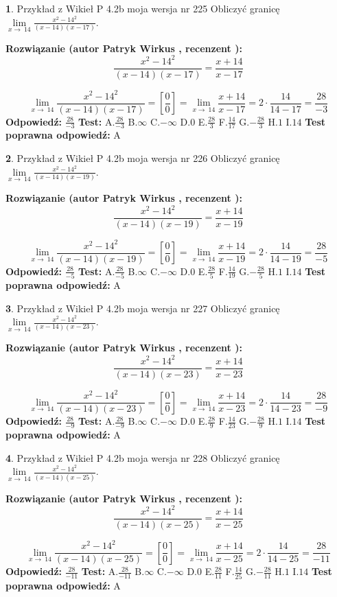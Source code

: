 \documentclass[12pt, a4paper]{article}
\theoremstyle{definition} %
\newtheorem{zad}{}
\newcommand{\zadStart}[1]{\begin{zad}#1\newline}
\newcommand{\zadStop}{\end{zad}}
\newcommand{\rozwStart}[2]{\noindent \textbf{Rozwiązanie (autor #1 , recenzent #2): }\newline}
\newcommand{\rozwStop}{\newline}
\newcommand{\odpStart}{\noindent \textbf{Odpowiedź:}\newline}
\newcommand{\odpStop}{\newline}
\newcommand{\testStart}{\noindent \textbf{Test:}\newline}
\newcommand{\testStop}{\newline}
\newcommand{\kluczStart}{\noindent \textbf{Test poprawna odpowiedź:}\newline}
\newcommand{\kluczStop}{\newline}
\begin{document}
\zadStart{Przykład z Wikieł P 4.2b moja wersja nr 225}
Obliczyć granicę $\lim\limits_{x\to\ 14}\frac{x^{2}-14^{2}}{(x-14)(x-17)}$.
\zadStop
\rozwStart{Patryk Wirkus}{}
$$\frac{x^{2}-14^{2}}{(x-14)(x-17)}=\frac{x+14}{x-17}$$

$$\lim\limits_{x\to\ 14}\frac{x^{2}-14^{2}}{(x-14)(x-17)}=[\frac{0}{0}]=\lim\limits_{x\to\ 14}\frac{x+14}{x-17}=2 \cdot \frac{14}{14-17} = \frac{28}{-3}$$
\rozwStop
\odpStart
$\frac{28}{-3}$
\odpStop
\testStart
A.$\frac{28}{-3}$
B.$\infty$
C.$-\infty$
D.$0$
E.$\frac{28}{3}$
F.$\frac{14}{17}$
G.$-\frac{28}{3}$
H.$1$
I.$14$
\testStop
\kluczStart
A
\kluczStop



\zadStart{Przykład z Wikieł P 4.2b moja wersja nr 226}
Obliczyć granicę $\lim\limits_{x\to\ 14}\frac{x^{2}-14^{2}}{(x-14)(x-19)}$.
\zadStop
\rozwStart{Patryk Wirkus}{}
$$\frac{x^{2}-14^{2}}{(x-14)(x-19)}=\frac{x+14}{x-19}$$

$$\lim\limits_{x\to\ 14}\frac{x^{2}-14^{2}}{(x-14)(x-19)}=[\frac{0}{0}]=\lim\limits_{x\to\ 14}\frac{x+14}{x-19}=2 \cdot \frac{14}{14-19} = \frac{28}{-5}$$
\rozwStop
\odpStart
$\frac{28}{-5}$
\odpStop
\testStart
A.$\frac{28}{-5}$
B.$\infty$
C.$-\infty$
D.$0$
E.$\frac{28}{5}$
F.$\frac{14}{19}$
G.$-\frac{28}{5}$
H.$1$
I.$14$
\testStop
\kluczStart
A
\kluczStop



\zadStart{Przykład z Wikieł P 4.2b moja wersja nr 227}
Obliczyć granicę $\lim\limits_{x\to\ 14}\frac{x^{2}-14^{2}}{(x-14)(x-23)}$.
\zadStop
\rozwStart{Patryk Wirkus}{}
$$\frac{x^{2}-14^{2}}{(x-14)(x-23)}=\frac{x+14}{x-23}$$

$$\lim\limits_{x\to\ 14}\frac{x^{2}-14^{2}}{(x-14)(x-23)}=[\frac{0}{0}]=\lim\limits_{x\to\ 14}\frac{x+14}{x-23}=2 \cdot \frac{14}{14-23} = \frac{28}{-9}$$
\rozwStop
\odpStart
$\frac{28}{-9}$
\odpStop
\testStart
A.$\frac{28}{-9}$
B.$\infty$
C.$-\infty$
D.$0$
E.$\frac{28}{9}$
F.$\frac{14}{23}$
G.$-\frac{28}{9}$
H.$1$
I.$14$
\testStop
\kluczStart
A
\kluczStop



\zadStart{Przykład z Wikieł P 4.2b moja wersja nr 228}
Obliczyć granicę $\lim\limits_{x\to\ 14}\frac{x^{2}-14^{2}}{(x-14)(x-25)}$.
\zadStop
\rozwStart{Patryk Wirkus}{}
$$\frac{x^{2}-14^{2}}{(x-14)(x-25)}=\frac{x+14}{x-25}$$

$$\lim\limits_{x\to\ 14}\frac{x^{2}-14^{2}}{(x-14)(x-25)}=[\frac{0}{0}]=\lim\limits_{x\to\ 14}\frac{x+14}{x-25}=2 \cdot \frac{14}{14-25} = \frac{28}{-11}$$
\rozwStop
\odpStart
$\frac{28}{-11}$
\odpStop
\testStart
A.$\frac{28}{-11}$
B.$\infty$
C.$-\infty$
D.$0$
E.$\frac{28}{11}$
F.$\frac{14}{25}$
G.$-\frac{28}{11}$
H.$1$
I.$14$
\testStop
\kluczStart
A
\kluczStop
\end{document}
